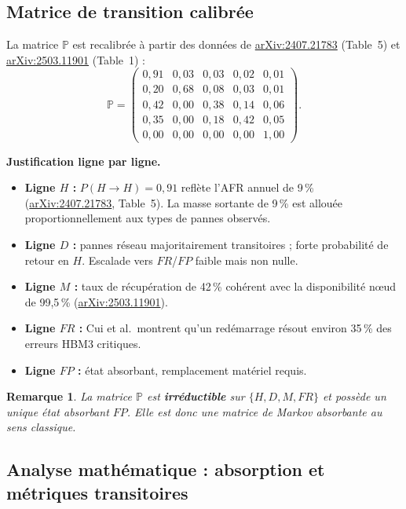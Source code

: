 \documentclass[12pt,a4paper]{article}
\newtheorem{remark}{Remarque}
\begin{document}
\subsection{Matrice de transition calibrée}

La matrice $\mathbb{P}$ est recalibrée à partir des données de
\href{https://arxiv.org/pdf/2407.21783}{arXiv:2407.21783} (Table~5)
et \href{https://arxiv.org/pdf/2503.11901}{arXiv:2503.11901} (Table~1) :
\[
\mathbb{P} =
\begin{pmatrix}
0{,}91 & 0{,}03 & 0{,}03 & 0{,}02 & 0{,}01 \\
0{,}20 & 0{,}68 & 0{,}08 & 0{,}03 & 0{,}01 \\
0{,}42 & 0{,}00 & 0{,}38 & 0{,}14 & 0{,}06 \\
0{,}35 & 0{,}00 & 0{,}18 & 0{,}42 & 0{,}05 \\
0{,}00 & 0{,}00 & 0{,}00 & 0{,}00 & 1{,}00
\end{pmatrix}.
\]

\textbf{Justification ligne par ligne.}
\begin{itemize}
  \item \textbf{Ligne $H$ :} $P(H\to H)=0{,}91$ reflète l'AFR annuel de 9\,\%
        (\href{https://arxiv.org/pdf/2407.21783}{arXiv:2407.21783}, Table~5).
        La masse sortante de 9\,\% est allouée proportionnellement aux types de pannes observés.
  \item \textbf{Ligne $D$ :} pannes réseau majoritairement transitoires ; forte probabilité
        de retour en $H$. Escalade vers $FR$/$FP$ faible mais non nulle.
  \item \textbf{Ligne $M$ :} taux de récupération de 42\,\% cohérent avec la disponibilité
        nœud de 99,5\,\% (\href{https://arxiv.org/pdf/2503.11901}{arXiv:2503.11901}).
  \item \textbf{Ligne $FR$ :} Cui et al.\ montrent qu'un redémarrage résout environ 35\,\%
        des erreurs HBM3 critiques.
  \item \textbf{Ligne $FP$ :} état absorbant, remplacement matériel requis.
\end{itemize}

\begin{remark}
La matrice $\mathbb{P}$ est \textbf{irréductible} sur $\{H,D,M,FR\}$ et possède
un unique état absorbant $FP$. Elle est donc une matrice de Markov absorbante au sens classique.
\end{remark}

\subsection{Analyse mathématique : absorption et métriques transitoires}
\end{document}
